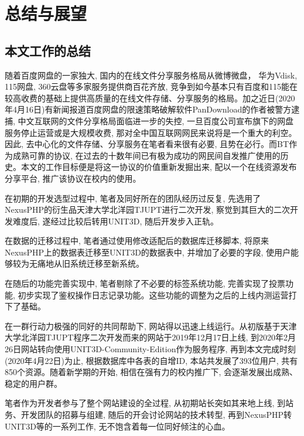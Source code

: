 
\chapter{总结与展望}


\section{本文工作的总结}

随着百度网盘的一家独大, 国内的在线文件分享服务格局从微博微盘， 华为Vdisk, 115网盘, 360云盘等多家服务提供商百花齐放, 竞争到如今基本只有百度和115能在较高收费的基础上提供高质量的在线文件存储、分享服务的格局。加之近日(2020年4月16日)有新闻报道百度网盘的限速策略破解软件PanDownload的作者被警方逮捕\cite{sina2020pandownload}, 中文互联网的文件分享格局面临进一步的失控, 一旦百度公司宣布旗下的网盘服务停止运营或是大规模收费, 那对全中国互联网网民来说将是一个重大的利空。因此, 去中心化的文件存储、分享服务在笔者看来很有必要, 且势在必行。而BT作为成熟可靠的协议, 在过去的十数年间已有极为成功的网民间自发推广使用的历史。本文的工作目标便是将这一协议的价值重新发掘出来, 配以一个在线资源发布分享平台, 推广该协议在校内的使用。

在初期的开发选型过程中, 笔者及同好所在的团队经历过反复, 先选用了NexusPHP的衍生品天津大学北洋园TJUPT进行二次开发, 察觉到其巨大的二次开发难度后, 遂经过比较后转用UNIT3D, 随后开发步入正轨。

在数据的迁移过程中, 笔者通过使用修改适配后的数据库迁移脚本, 将原来NexusPHP上的数据表迁移至UNIT3D的数据表中, 并增加了必要的字段, 使用户能够较为无痛地从旧系统迁移至新系统。

在随后的功能完善实现中, 笔者剔除了不必要的标签系统功能, 完善实现了投票功能, 初步实现了鉴权操作日志记录功能。这些功能的调整为之后的上线内测运营打下了基础。

在一群行动力极强的同好的共同帮助下, 网站得以迅速上线运行。从初版基于天津大学北洋园TJUPT程序二次开发而来的网站于2019年12月17日上线, 到2020年2月26日网站转向使用UNIT3D-Community-Edition作为服务程序, 再到本文完成时刻(2020年4月22日)为止, 根据数据库中各表的自增ID, 本站共发展了393位用户, 共有850个资源。随着新学期的开始, 相信在强有力的校内推广下, 会逐渐发展出成熟、稳定的用户群。

笔者作为开发者参与了整个网站建设的全过程, 从初期站长突如其来地上线, 到站务、开发团队的招募与组建, 随后的开会讨论网站的技术转型, 再到NexusPHP转UNIT3D等的一系列工作, 无不饱含着每一位同好倾注的心血。


